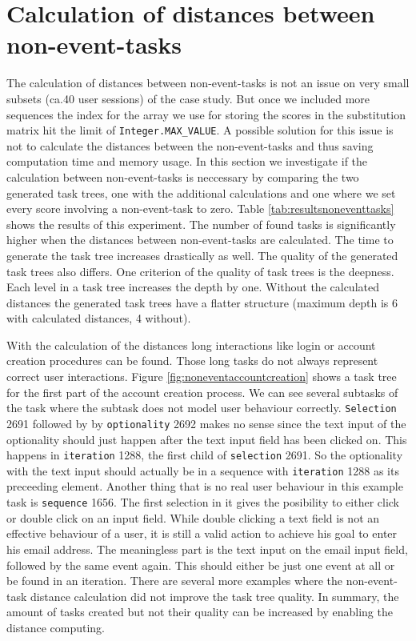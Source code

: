 \section{Calculation of distances between non-event-tasks}
\label{sec:noneventtasks}
The calculation of distances between non-event-tasks is not an issue on very small subsets (ca.40 user sessions) of the case study.
But once we included more sequences the index for the array we use for storing the scores in the substitution matrix hit the limit of \texttt{Integer.MAX\_VALUE}.
A possible solution for this issue is not to calculate the distances between the non-event-tasks and thus saving computation time and memory usage.
In this section we investigate if the calculation between non-event-tasks is neccessary by comparing the two generated task trees, one with the additional calculations and one where
we set every score involving a non-event-task to zero. Table \ref{tab:resultsnoneventtasks} shows the results of this experiment.
The number of found tasks is significantly higher when the distances between non-event-tasks are calculated.
The time to generate the task tree increases drastically as well.
The quality of the generated task trees also differs.
One criterion of the quality of task trees is the deepness. Each level in a task tree increases the depth by one.
Without the calculated distances the generated task trees have a flatter structure (maximum depth is 6 with calculated distances, 4 without).

With the calculation of the distances long interactions like login or account creation procedures can be found.
Those long tasks do not always represent correct user interactions.
Figure \ref{fig:noneventaccountcreation} shows a task tree for the first part of the account creation process.
We can see several subtasks of the task where the subtask does not model user behaviour correctly.
\texttt{Selection} 2691 followed by by \texttt{optionality} 2692 makes no sense since the text input of the optionality should just happen after the text input field has been clicked on.
This happens in \texttt{iteration} 1288, the first child of \texttt{selection} 2691. So the optionality with the text input should actually be in a sequence with \texttt{iteration} 1288 as its preceeding element.
Another thing that is no real user behaviour in this example task is \texttt{sequence} 1656.
The first selection in it gives the posibility to either click or double click on an input field.
While double clicking a text field is not an effective behaviour of a user, it is still a valid action to achieve his goal to enter his email address.
The meaningless part is the text input on the email input field, followed by the same event again. This should either be just one event at all or be found in an iteration.
There are several more examples where the non-event-task distance calculation did not improve the task tree quality.
In summary, the amount of tasks created  but not their quality can be increased by enabling the distance computing.

